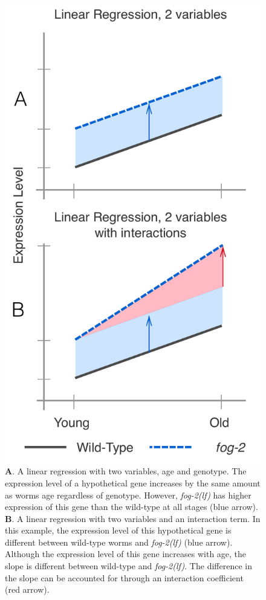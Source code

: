 \documentclass[9pt,twocolumn,twoside]{gsag3jnl}
\newcommand{\fog}{\emph{\mbox{fog-2(lf)}}}
\begin{document}
\begin{figure}[htbp]
  \renewcommand{\familydefault}{\sfdefault}\normalfont{}
  \centering
  \includegraphics[width=\linewidth]{../../output/figs/final_figs/linear_regression.pdf}
  \caption{
    \textbf{A}. A linear regression with two variables, age and genotype. The
    expression level of a hypothetical gene increases by the same amount as
    worms age regardless of genotype. However, \fog{} has higher expression
    of this gene than the wild-type at all stages (blue arrow). \textbf{B}. A
    linear regression with two variables and an interaction term. In this
    example, the expression level of this hypothetical gene is different between
    wild-type worms and \fog{} (blue arrow). Although the expression level of
    this gene increases with age, the slope is different between wild-type and
    \fog{}. The difference in the slope can be accounted for through an
    interaction coefficient (red arrow).
  }
\label{fig:linear_reg}
\end{figure}
\end{document}
